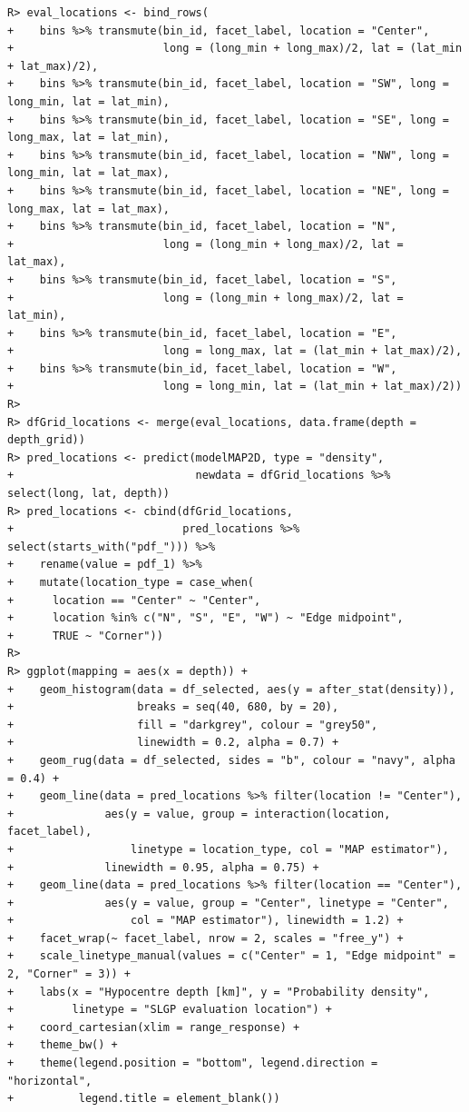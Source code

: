 \documentclass[
]{article}
\begin{document}
\begin{verbatim}
R> eval_locations <- bind_rows(
+    bins %>% transmute(bin_id, facet_label, location = "Center",
+                       long = (long_min + long_max)/2, lat = (lat_min + lat_max)/2),
+    bins %>% transmute(bin_id, facet_label, location = "SW", long = long_min, lat = lat_min),
+    bins %>% transmute(bin_id, facet_label, location = "SE", long = long_max, lat = lat_min),
+    bins %>% transmute(bin_id, facet_label, location = "NW", long = long_min, lat = lat_max),
+    bins %>% transmute(bin_id, facet_label, location = "NE", long = long_max, lat = lat_max),
+    bins %>% transmute(bin_id, facet_label, location = "N",
+                       long = (long_min + long_max)/2, lat = lat_max),
+    bins %>% transmute(bin_id, facet_label, location = "S",
+                       long = (long_min + long_max)/2, lat = lat_min),
+    bins %>% transmute(bin_id, facet_label, location = "E",
+                       long = long_max, lat = (lat_min + lat_max)/2),
+    bins %>% transmute(bin_id, facet_label, location = "W",
+                       long = long_min, lat = (lat_min + lat_max)/2))
R> 
R> dfGrid_locations <- merge(eval_locations, data.frame(depth = depth_grid))
R> pred_locations <- predict(modelMAP2D, type = "density",
+                            newdata = dfGrid_locations %>% select(long, lat, depth))
R> pred_locations <- cbind(dfGrid_locations,
+                          pred_locations %>% select(starts_with("pdf_"))) %>%
+    rename(value = pdf_1) %>%
+    mutate(location_type = case_when(
+      location == "Center" ~ "Center",
+      location %in% c("N", "S", "E", "W") ~ "Edge midpoint",
+      TRUE ~ "Corner"))
R> 
R> ggplot(mapping = aes(x = depth)) +
+    geom_histogram(data = df_selected, aes(y = after_stat(density)),
+                   breaks = seq(40, 680, by = 20),
+                   fill = "darkgrey", colour = "grey50",
+                   linewidth = 0.2, alpha = 0.7) +
+    geom_rug(data = df_selected, sides = "b", colour = "navy", alpha = 0.4) +
+    geom_line(data = pred_locations %>% filter(location != "Center"),
+              aes(y = value, group = interaction(location, facet_label),
+                  linetype = location_type, col = "MAP estimator"),
+              linewidth = 0.95, alpha = 0.75) +
+    geom_line(data = pred_locations %>% filter(location == "Center"),
+              aes(y = value, group = "Center", linetype = "Center",
+                  col = "MAP estimator"), linewidth = 1.2) +
+    facet_wrap(~ facet_label, nrow = 2, scales = "free_y") +
+    scale_linetype_manual(values = c("Center" = 1, "Edge midpoint" = 2, "Corner" = 3)) +
+    labs(x = "Hypocentre depth [km]", y = "Probability density",
+         linetype = "SLGP evaluation location") +
+    coord_cartesian(xlim = range_response) +
+    theme_bw() +
+    theme(legend.position = "bottom", legend.direction = "horizontal",
+          legend.title = element_blank())
\end{verbatim}
\end{document}
